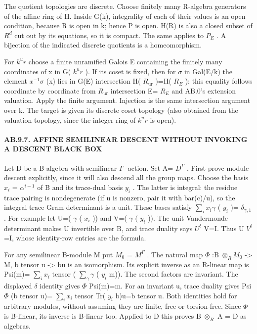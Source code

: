 \documentclass[
  11pt,
]{article}
\begin{document}
The quotient topologies are discrete. Choose finitely many R-algebra
generators of the affine ring of H. Inside G(k), integrality of each of
their values is an open condition, because R is open in k; hence P is
open. H(R) is also a closed subset of \(R^d\) cut out by its equations,
so it is compact. The same applies to \(P_{E}\) . A bijection of the
indicated discrete quotients is a homeomorphism.

For \(k^ur\) choose a finite unramified Galois E containing the finitely
many coordinates of x in G( \(k^ur\) ). If its coset is fixed, then for
\(\sigma\) in Gal(E/k) the element \(x^{-1} \sigma\) (x) lies in G(E)
intersection H( \(R_{\mathrm{ur}}\) )=H( \(R_{E}\) ): this equality
follows coordinate by coordinate from \(R_{\mathrm{ur}}\) intersection
E= \(R_{E}\) and AB.0's extension valuation. Apply the finite argument.
Injection is the same intersection argument over k. The target is given
its discrete coset topology (also obtained from the valuation topology,
since the integer ring of \(k^ur\) is open).

\paragraph{AB.9.7. AFFINE SEMILINEAR DESCENT WITHOUT INVOKING A DESCENT
BLACK
BOX}\label{ab.9.7.-affine-semilinear-descent-without-invoking-a-descent-black-box}

Let D be a B-algebra with semilinear \(\Gamma\) -action. Set A=
\(D^\Gamma\) . First prove module descent explicitly, since it will also
descend all the group maps. Choose the basis \(x_{i}\) =
\(\alpha^{i-1}\) of B and its trace-dual basis \(y_{i}\) . The latter is
integral: the residue trace pairing is nondegenerate (if u is nonzero,
pair it with bar(c)/u), so the integral trace Gram determinant is a
unit. These bases satisfy \(\sum_{i} x_{i} \gamma\) ( \(y_{i}\) )=
\(\delta_{\gamma,1}\) . For example let U=( \(\gamma\) ( \(x_{i}\) ))
and V=( \(\gamma\) ( \(y_{i}\) )). The unit Vandermonde determinant
makes U invertible over B, and trace duality says \(U^t\) V=I. Thus U
\(V^t\) =I, whose identity-row entries are the formula.

For any semilinear B-module M put \(M_{0}\) = \(M^\Gamma\) . The natural
map \(\Phi\) :B \(\otimes_{R} M_{0}\) -\textgreater{} M, b tensor u
\textbar-\textgreater{} bu is an isomorphism. Its explicit inverse as an
R-linear map is Psi(m)= \(\sum_{i} x_{i}\) tensor (
\(\sum_{\gamma} \gamma\) ( \(y_{i}\) m)). The second factors are
invariant. The displayed \(\delta\) identity gives \(\Phi\) Psi(m)=m.
For an invariant u, trace duality gives Psi \(\Phi\) (b tensor u)=
\(\sum_{i} x_{i}\) tensor Tr( \(y_{i}\) b)u=b tensor u. Both identities
hold for arbitrary modules, without assuming they are finite, free or
torsion-free. Since \(\Phi\) is B-linear, its inverse is B-linear too.
Applied to D this proves B \(\otimes_{R}\) A = D as algebras.
\end{document}
